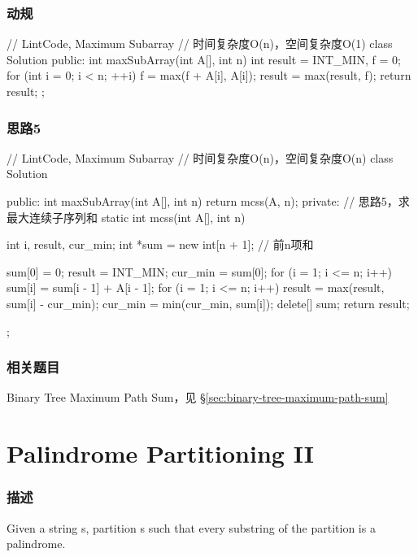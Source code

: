 \subsubsection{动规}
\begin{Code}
// LintCode, Maximum Subarray
// 时间复杂度O(n)，空间复杂度O(1)
class Solution {
public:
    int maxSubArray(int A[], int n) {
        int result = INT_MIN, f = 0;
        for (int i = 0; i < n; ++i) {
            f = max(f + A[i], A[i]);
            result = max(result, f);
        }
        return result;
    }
};
\end{Code}


\subsubsection{思路5}
\begin{Code}
// LintCode, Maximum Subarray
// 时间复杂度O(n)，空间复杂度O(n)
class Solution {
public:
    int maxSubArray(int A[], int n) {
        return mcss(A, n);
    }
private:
    // 思路5，求最大连续子序列和
    static int mcss(int A[], int n) {
        int i, result, cur_min;
        int *sum = new int[n + 1];  // 前n项和

        sum[0] = 0;
        result = INT_MIN;
        cur_min = sum[0];
        for (i = 1; i <= n; i++) {
            sum[i] = sum[i - 1] + A[i - 1];
        }
        for (i = 1; i <= n; i++) {
            result = max(result, sum[i] - cur_min);
            cur_min = min(cur_min, sum[i]);
        }
        delete[] sum;
        return result;
    }
};
\end{Code}


\subsubsection{相关题目}
\begindot
\item Binary Tree Maximum Path Sum，见 \S \ref{sec:binary-tree-maximum-path-sum}
\myenddot


\section{Palindrome Partitioning II} %
\label{sec:palindrome-partitioning-ii}


\subsubsection{描述}
Given a string s, partition s such that every substring of the partition is a palindrome.

